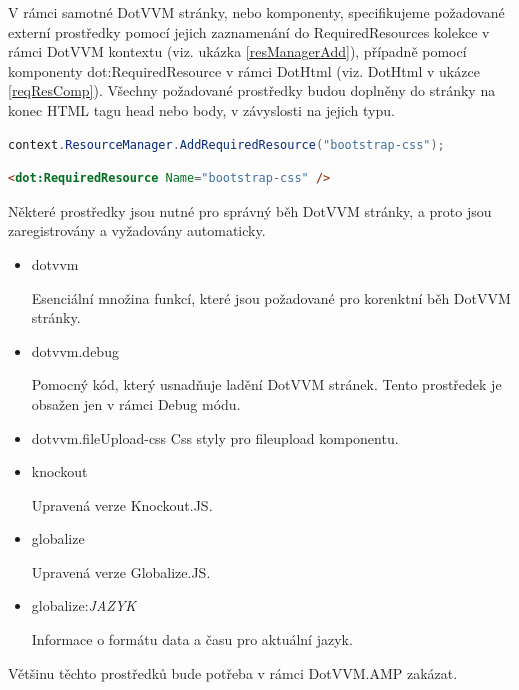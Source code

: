 V rámci samotné DotVVM stránky, nebo komponenty, specifikujeme požadované externí prostředky pomocí jejich zaznamenání do RequiredResources kolekce v rámci DotVVM kontextu (viz. ukázka \ref{resManagerAdd}), případně pomocí komponenty dot:RequiredResource v rámci DotHtml (viz. DotHtml v ukázce \ref{reqResComp}).
Všechny požadované prostředky budou doplněny do stránky na konec HTML tagu head nebo body, v závyslosti na jejich typu.

\begin{lstlisting}[language=c#, caption=Specifikace požadovaného prostředku v rámci C# kódu,label=resManagerAdd,captionpos=t]
context.ResourceManager.AddRequiredResource("bootstrap-css");

\end{lstlisting}

\begin{lstlisting}[language=Html, caption=Specifikace požadovaného prostředku v rámci DotHtml,label=reqResComp,captionpos=t]
<dot:RequiredResource Name="bootstrap-css" />

\end{lstlisting}
Některé prostředky jsou nutné pro správný běh DotVVM stránky, a proto jsou zaregistrovány a vyžadovány automaticky.

\begin{itemize}
    \item dotvvm
    
    Esenciální množina funkcí, které jsou požadované pro korenktní běh DotVVM stránky.
    \item dotvvm.debug
    
    Pomocný kód, který usnadňuje ladění DotVVM stránek. Tento prostředek je obsažen jen v rámci Debug módu.
    
    \item dotvvm.fileUpload-css
    Css styly pro fileupload komponentu.
    
    \item knockout
    
    Upravená verze Knockout.JS.
    \item globalize
    
    Upravená verze Globalize.JS.
    \item globalize:\textit{JAZYK}
    
    Informace o formátu data a času pro aktuální jazyk.
\end{itemize}
Většinu těchto prostředků bude potřeba v rámci DotVVM.AMP zakázat.
